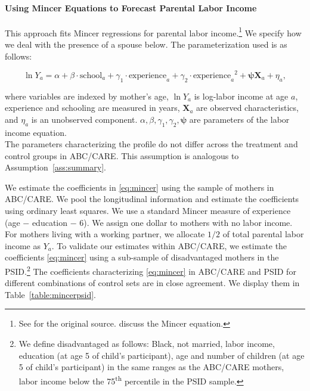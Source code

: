 \paragraph{Using Mincer Equations to Forecast Parental Labor Income} \label{appendix:mincerpar}

\noindent This approach fits Mincer regressions for parental labor income.\footnote{See \citet{Mincer_1974_schooling} for the original source. \citet{Heckman_Lochner_ea_2006_HEE} discuss the Mincer equation.} We specify how we deal with the presence of a spouse below. The parameterization used is as follows:

\begin{equation}
\ln Y_{a} = \alpha + \beta \cdot \text{school}_{a} + \gamma_{1}  \cdot \text{experience}_{a} + \gamma_{2} \cdot {\text{experience}_{a}}^2 + \bm{\psi} \mathbf{X}_{a} + \eta_{a}, \label{eq:mincer}
\end{equation}

\noindent where variables are indexed by mother's age, $\ln Y_a$ is log-labor income at age $a$, experience and schooling are measured in years, $ \mathbf{X}_{a}$ are observed characteristics, and $\eta_{a}$ is an unobserved component. $\alpha, \beta, \gamma_{1}, \gamma_{2}, \bm{\psi}$ are parameters of the labor income equation. \\

\noindent The parameters characterizing the profile do not differ across the treatment and control groups in ABC/CARE. This assumption is analogous to Assumption~\ref{ass:summary}.

\noindent We estimate the coefficients in \eqref{eq:mincer} using the sample of mothers in ABC/CARE. We pool the longitudinal information and estimate the coefficients using ordinary least squares. We use a standard Mincer measure of experience (age $-$ education $-$ 6). We assign one dollar to mothers with no labor income. For mothers living with a working partner, we allocate $1/2$ of total parental labor income as $Y_{a}$. To validate our estimates within ABC/CARE, we estimate the coefficients \eqref{eq:mincer} using a sub-sample of disadvantaged mothers in the PSID.\footnote{We define disadvantaged as follows: Black, not married, labor income, education (at age 5 of child's participant), age and number of children (at age 5 of child's participant) in the same ranges as the ABC/CARE mothers, labor income below the 75\textsuperscript{th} percentile in the PSID sample.} The coefficients characterizing \eqref{eq:mincer} in ABC/CARE and PSID for different combinations of control sets are in close agreement. We display them in Table~\ref{table:mincerpsid}.

